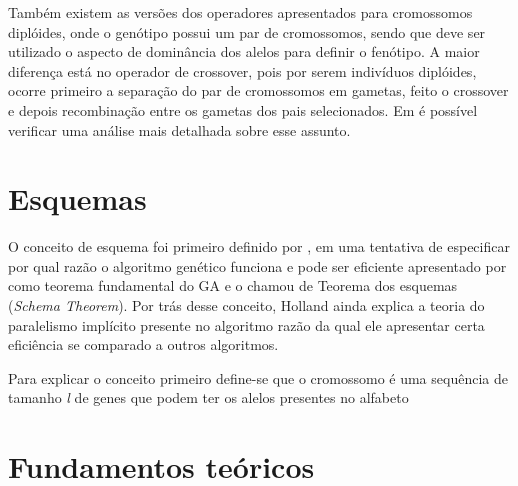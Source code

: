 Também existem as versões dos operadores apresentados para cromossomos diplóides, onde o genótipo possui um par de cromossomos, sendo que deve ser utilizado o aspecto de dominância dos alelos para definir o fenótipo. A maior diferença está no operador de crossover, pois por serem indivíduos diplóides, ocorre primeiro a separação do par de cromossomos em gametas, feito o crossover e depois recombinação entre os gametas dos pais selecionados. Em \cite{Goldberg1989} é possível verificar uma análise mais detalhada sobre esse assunto.

\section{Esquemas}
\label{sec:esquemas}
O conceito de esquema foi primeiro definido por \citeauthor{Holland1992}, em uma tentativa de especificar por qual razão o algoritmo genético funciona e pode ser eficiente apresentado por \citeauthor{Goldberg1989} como teorema fundamental do GA e o chamou de Teorema dos esquemas (\textit{Schema Theorem}). Por trás desse conceito, Holland ainda explica a teoria do paralelismo implícito presente no algoritmo razão da qual ele apresentar certa eficiência se comparado a outros algoritmos.

Para explicar o conceito primeiro define-se que o cromossomo é uma sequência de tamanho \textit{l} de genes que podem ter os alelos presentes no alfabeto 

\section{Fundamentos teóricos}